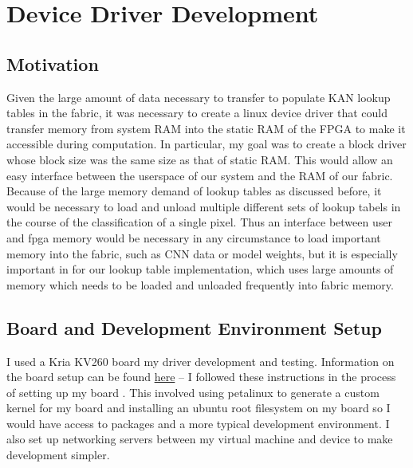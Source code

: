 \documentclass[psamsfonts]{amsart}
\theoremstyle{definition}
\theoremstyle{remark}
\numberwithin{equation}{section}
\begin{document}
\section{Device Driver Development}

\subsection{Motivation}
Given the large amount of data necessary to transfer to populate KAN lookup tables in the fabric, it was necessary to create a linux device driver that could transfer memory from system RAM into the static RAM of the FPGA to make it accessible during computation. In particular, my goal was to create a block driver whose block size was the same size as that of static RAM. This would allow an easy interface between the userspace of our system and the RAM of our fabric. Because of the large memory demand of lookup tables as discussed before, it would be necessary to load and unload multiple different sets of lookup tabels in the course of the classification of a single pixel. Thus an interface between user and fpga memory would be necessary in any circumstance to load important memory into the fabric, such as CNN data or model weights, but it is especially important in for our lookup table implementation, which uses large amounts of memory which needs to be loaded and unloaded frequently into fabric memory.  %



\subsection{Board and Development Environment Setup}
I used a Kria KV260 board my driver development and testing. Information on the board setup can be found \href{https://github.com/night1rider/Xilinx-KR260-Intro/blob/Hello-World/Documentation/00_hello_world_kr260.md}{here} -- I followed these instructions in the process of setting up my board \cite{board-setup}. This involved using petalinux to generate a custom kernel for my board and installing an ubuntu root filesystem on my board so I would have access to packages and a more typical development environment. I also set up networking servers between my virtual machine and device to make development simpler.
\end{document}
